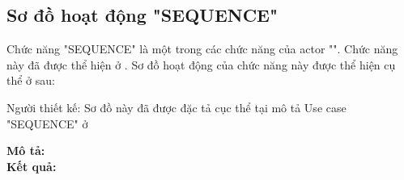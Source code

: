 \subsection{Sơ đồ hoạt động "SEQUENCE"}
\setcounter{figure}{0}

Chức năng "SEQUENCE" là một trong các chức năng của actor "".
Chức năng này đã được thể hiện ở \myref{}.
Sơ đồ hoạt động của chức năng này được thể hiện cụ thể ở \myref{} sau:

Người thiết kế:
Sơ đồ này đã được đặc tả cục thể tại mô tả Use case "SEQUENCE" ở \myreftb{}

\noindent
\textbf{Mô tả:}\\

\noindent
\textbf{Kết quả:}


